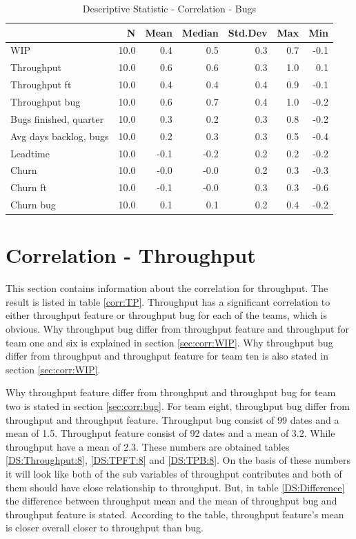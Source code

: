 \documentclass[UKenglish]{ifimaster}  %
\begin{document}
\begin{table}[!htbp]
 \centering
 \begin{tabular}{ | l | r | r | r | r | r | r | }
 \hline
& N & Mean & Median & Std.Dev & Max & Min \\ \hline
WIP  & 10.0 & 0.4 & 0.5 & 0.3 & 0.7 & -0.1\\ \hline
Throughput  & 10.0 & 0.6 & 0.6 & 0.3 & 1.0 & 0.1\\ \hline
Throughput ft  & 10.0 & 0.4 & 0.4 & 0.4 & 0.9 & -0.1\\ \hline
Throughput bug  & 10.0 & 0.6 & 0.7 & 0.4 & 1.0 & -0.2\\ \hline
Bugs finished, quarter  & 10.0 & 0.3 & 0.2 & 0.3 & 0.8 & -0.2\\ \hline
Avg days backlog, bugs  & 10.0 & 0.2 & 0.3 & 0.3 & 0.5 & -0.4\\ \hline
Leadtime  & 10.0 & -0.1 & -0.2 & 0.2 & 0.2 & -0.2\\ \hline
Churn  & 10.0 & -0.0 & -0.0 & 0.2 & 0.3 & -0.3\\ \hline
Churn ft  & 10.0 & -0.1 & -0.0 & 0.3 & 0.3 & -0.6\\ \hline
Churn bug  & 10.0 & 0.1 & 0.1 & 0.2 & 0.4 & -0.2\\ \hline
\end{tabular}
 \caption{Descriptive Statistic - Correlation - Bugs}
 \label{DS:corr:Bugs}
 \end{table}


\section {Correlation - Throughput}
\label{sec:corr:TP}
This section contains information about the correlation for throughput. The result is listed in table \ref{corr:TP}. Throughput has a significant correlation to either throughput feature or throughput bug for each of the teams, which is obvious. Why throughput bug differ from throughput feature and throughput for team one and six is explained in section \ref{sec:corr:WIP}.   Why throughput bug differ from throughput and throughput feature for team ten is also stated in section \ref{sec:corr:WIP}.  

Why throughput feature differ from throughput and throughput bug for team two is stated in section \ref{sec:corr:bug}. For team eight, throughput bug differ from throughput and throughput feature.  Throughput bug consist of 99 dates and a mean of 1.5. Throughput feature consist of 92 dates and a mean of 3.2. While throughput have a mean of 2.3. These numbers are obtained tables \ref{DS:Throughput:8}, \ref{DS:TPFT:8} and \ref{DS:TPB:8}.  On the basis of these numbers it will look like both of the sub variables of throughput contributes and both of them should have close relationship to throughput.  But, in table \ref{DS:Difference} the difference between throughput mean and the mean of throughput bug and throughput feature is stated. According to the table, throughput feature's mean is closer overall closer to throughput than bug.
\end{document}
